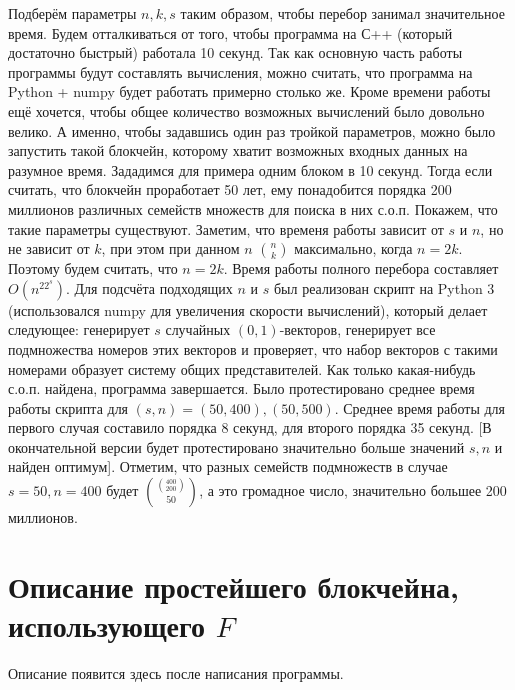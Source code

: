 \documentclass{article}
\begin{document}
    Подберём параметры $n, k, s$ таким образом, чтобы перебор занимал значительное время. Будем отталкиваться от того, чтобы программа на С++ (который достаточно быстрый) работала 10 секунд. Так как основную часть работы программы будут составлять вычисления, можно считать, что программа на Python + numpy будет работать примерно столько же.
    Кроме времени работы ещё хочется, чтобы общее количество возможных вычислений было довольно велико. А именно, чтобы задавшись один раз тройкой параметров, можно было запустить такой блокчейн, которому хватит возможных входных данных на разумное время. Зададимся для примера одним блоком в 10 секунд. Тогда если считать, что блокчейн проработает 50 лет, ему понадобится порядка 200 миллионов различных семейств множеств для поиска в них с.о.п.
    Покажем, что такие параметры существуют. Заметим, что временя работы зависит от $s$ и $n$, но не зависит от $k$, при этом при данном $n$ $n \choose k$ максимально, когда $n = 2k$. Поэтому будем считать, что $n = 2k$. Время работы полного перебора составляет $O(n^22^s)$.
    Для подсчёта подходящих $n$ и $s$ был реализован скрипт на Python 3 (использовался numpy для увеличения скорости вычислений), который делает следующее: генерирует $s$ случайных $(0, 1)$-векторов, генерирует все подмножества номеров этих векторов и проверяет, что набор векторов с такими номерами образует систему общих представителей. Как только какая-нибудь с.о.п. найдена, программа завершается. 
    Было протестировано среднее время работы скрипта для $(s, n) = (50, 400), (50, 500)$. Среднее время работы для первого случая составило порядка 8 секунд, для второго порядка 35 секунд. [В окончательной версии будет протестировано значительно больше значений $s, n$ и найден оптимум].
    Отметим, что разных семейств подмножеств в случае $s = 50, n = 400$ будет ${400 \choose 200} \choose {50} $, а это громадное число, значительно большее 200 миллионов.
\section{Описание простейшего блокчейна, использующего $F$}

Описание появится здесь после написания программы.
\end{document}
